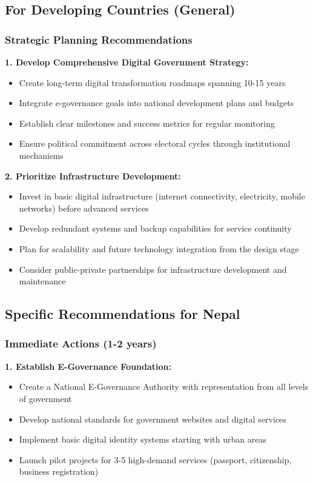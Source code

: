\documentclass[12pt,a4paper]{article}
\begin{document}
\subsection{For Developing Countries (General)}

\subsubsection{Strategic Planning Recommendations}

\textbf{1. Develop Comprehensive Digital Government Strategy:}
\begin{itemize}
    \item Create long-term digital transformation roadmaps spanning 10-15 years
    \item Integrate e-governance goals into national development plans and budgets
    \item Establish clear milestones and success metrics for regular monitoring
    \item Ensure political commitment across electoral cycles through institutional mechanisms
\end{itemize}

\textbf{2. Prioritize Infrastructure Development:}
\begin{itemize}
    \item Invest in basic digital infrastructure (internet connectivity, electricity, mobile networks) before advanced services
    \item Develop redundant systems and backup capabilities for service continuity
    \item Plan for scalability and future technology integration from the design stage
    \item Consider public-private partnerships for infrastructure development and maintenance
\end{itemize}

\subsection{Specific Recommendations for Nepal}

\subsubsection{Immediate Actions (1-2 years)}

\textbf{1. Establish E-Governance Foundation:}
\begin{itemize}
    \item Create a National E-Governance Authority with representation from all levels of government
    \item Develop national standards for government websites and digital services
    \item Implement basic digital identity systems starting with urban areas
    \item Launch pilot projects for 3-5 high-demand services (passport, citizenship, business registration)
\end{itemize}
\end{document}
